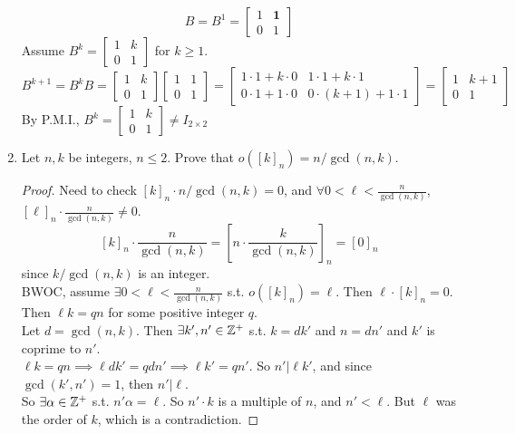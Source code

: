 \documentclass[12pt]{article}
\begin{document}
\begin{enumerate}
	\[B = B^1 = \begin{bmatrix}
		1 & \textbf{1}\\
		0 & 1
	\end{bmatrix}\]
	Assume $B^k = \begin{bmatrix}
		1 & k\\
		0 & 1
	\end{bmatrix}$ for $k \geq 1$.
	\[B^{k+1} = B^kB = \begin{bmatrix}
		1 & k\\
		0 & 1
	\end{bmatrix}\begin{bmatrix}
		1 & 1\\
		0 & 1
	\end{bmatrix} = \begin{bmatrix}
		1\cdot1+k\cdot0 & 1\cdot1+k\cdot1 \\
		0\cdot1+1\cdot0 & 0\cdot(k+1)+1\cdot1
	\end{bmatrix} = \begin{bmatrix}
	1 & k+1 \\
	0 & 1
	\end{bmatrix}\]
	By P.M.I., $B^k = \begin{bmatrix}
		1 & k\\
		0 & 1
	\end{bmatrix} \neq I_{2\times2}$
	
	\item Let $n,k$ be integers, $n\leq2$. Prove that $o([k]_n) = n/\gcd(n,k)$.
	\begin{proof}
		Need to check $[k]_n \cdot n/\gcd(n,k) = 0$, and $\forall 0<\ell<\frac{n}{\gcd(n,k)}$,\medspace$ [\ell]_n \cdot \frac{n}{\gcd(n,k)} \neq 0$.\\
		\[[k]_n\cdot\frac{n}{\gcd(n,k)} = \left[n\cdot\frac{k}{\gcd(n,k)}\right]_n = [0]_n\]
		since $k/\gcd(n,k)$ is an integer.\\
		BWOC, assume $\exists 0<\ell<\frac{n}{\gcd(n,k)}$ s.t. $o([k]_n) = \ell$. Then $\ell\cdot[k]_n = 0$. Then $\ell k = qn$ for some positive integer $q$.\\
		Let $d=\gcd(n,k)$. Then $\exists k',n'\in\mathbb{Z}^+$ s.t. $k=dk'$ and $n=dn'$ and $k'$ is coprime to $n'$.\\
		$\ell k = qn \implies \ell dk' = qdn' \implies \ell k' =qn'$. So $n'|\ell k'$, and since $\gcd(k',n')=1$, then $n'|\ell$.\\
		So $\exists \alpha \in \mathbb{Z}^+$ s.t. $n'\alpha = \ell$. So $n'\cdot k $ is a multiple of $n$, and $n'<\ell$. But $\ell$ was the order of $k$, which is a contradiction.
	\end{proof} 


\end{enumerate}
\end{document}
